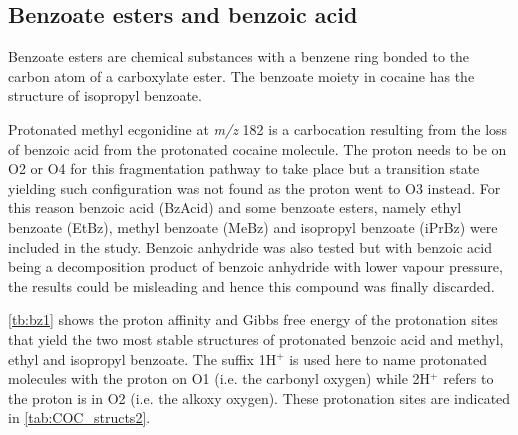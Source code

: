\subsection{Benzoate esters and benzoic acid}
Benzoate esters are chemical substances with a benzene ring bonded to the carbon atom of a carboxylate ester. 
%
The benzoate moiety in cocaine has the structure of isopropyl benzoate.
%


Protonated methyl ecgonidine at \textit{m/z} 182 is a carbocation resulting from the loss of benzoic acid from the protonated cocaine molecule.
%
The proton needs to be on O2 or O4 for this fragmentation pathway to take place but a transition state yielding such configuration was not found as the proton went to O3 instead. %
For this reason benzoic acid (BzAcid) and some benzoate esters, namely ethyl benzoate (EtBz), methyl benzoate (MeBz) and isopropyl benzoate (iPrBz)  were included in the study.
%
Benzoic anhydride was also tested but with benzoic acid being a decomposition product of benzoic anhydride with lower vapour pressure, the results could be misleading and hence this compound was finally discarded.




 
 \autoref{tb:bz1} shows the proton affinity and Gibbs free energy of the protonation sites that yield the two most stable structures of protonated benzoic acid and methyl, ethyl and isopropyl benzoate.
 The suffix 1H$^+$ is used here to name protonated molecules with the proton on O1 (i.e. the carbonyl oxygen) while  2H$^+$ refers to the proton is in O2 (i.e. the alkoxy oxygen).
 These protonation sites are indicated in \autoref{tab:COC_structs2}. 
%

 
 
 



